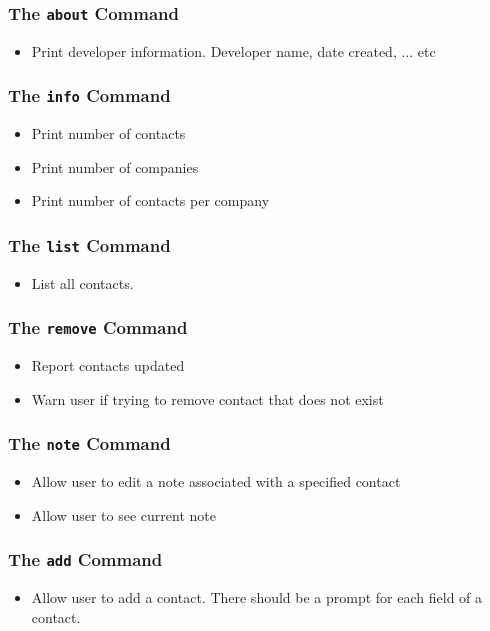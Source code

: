 \documentclass[11pt]{cselabheader}
\begin{document}
\subsubsection{The \texttt{about} Command}
\begin{itemize}
\item Print developer information. Developer name, date created, ... etc
\end{itemize}

\subsubsection{The \texttt{info} Command}
\begin{itemize}
\item Print number of contacts
\item Print number of companies
\item Print number of contacts per company
\end{itemize}

\subsubsection{The \texttt{list} Command}
\begin{itemize}
\item List all contacts.
\end{itemize}

\subsubsection{The \texttt{remove} Command}
\begin{itemize}
\item Report contacts updated
\item Warn user if trying to remove contact that does not exist
\end{itemize}

\subsubsection{The \texttt{note} Command}
\begin{itemize}
\item Allow user to edit a note associated with a specified contact
\item Allow user to see current note
\end{itemize}

\subsubsection{The \texttt{add} Command}
\begin{itemize}
\item Allow user to add a contact. There should be a prompt for each field of a
    contact.
\end{itemize}
\end{document}
